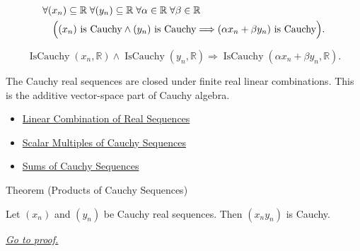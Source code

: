 \begin{remark*}
\[
\begin{aligned}
&\forall (x_n)\subseteq\mathbb{R}\;\forall (y_n)\subseteq\mathbb{R}\;
 \forall \alpha\in\mathbb{R}\;\forall \beta\in\mathbb{R}\\
&\quad
\Bigl(
  (x_n)\text{ is Cauchy}
  \land
  (y_n)\text{ is Cauchy}
  \Longrightarrow
  (\alpha x_n+\beta y_n)\text{ is Cauchy}
\Bigr).
\end{aligned}
\]
\end{remark*}

\begin{remark*}
\[
\operatorname{IsCauchy}(x_n,\mathbb{R})
\land
\operatorname{IsCauchy}(y_n,\mathbb{R})
\Longrightarrow
\operatorname{IsCauchy}(\alpha x_n+\beta y_n,\mathbb{R}).
\]
\end{remark*}

\begin{remark*}[Interpretation]
The Cauchy real sequences are closed under finite real linear combinations.
This is the additive vector-space part of Cauchy algebra.
\end{remark*}

\begin{dependencies}
\begin{itemize}
  \item \hyperref[def:linear-combination-of-real-sequences]{Linear Combination of Real Sequences}
  \item \hyperref[thm:scalar-multiple-cauchy-sequence]{Scalar Multiples of Cauchy Sequences}
  \item \hyperref[thm:sum-cauchy-sequences]{Sums of Cauchy Sequences}
\end{itemize}
\end{dependencies}


\begin{theorembox}{Theorem (Products of Cauchy Sequences)}
\begin{theorem}
\label{thm:product-cauchy-sequences}
Let $(x_n)$ and $(y_n)$ be Cauchy real sequences. Then $(x_ny_n)$ is
Cauchy.

\smallskip
\noindent
\hyperref[prf:product-cauchy-sequences]{\textit{Go to proof.}}
\end{theorem}
\end{theorembox}

